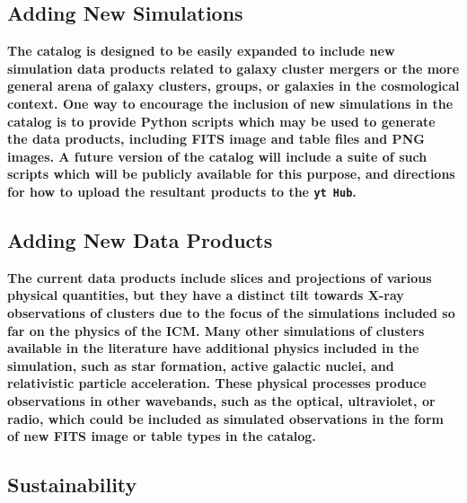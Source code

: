 \documentclass{emulateapj}
\newcommand{\code}[1]{\texttt{#1}}
\begin{document}
\subsection{Adding New Simulations}\label{sec:new_sims}

{\bf The catalog is designed to be easily expanded to include new simulation data products related to galaxy cluster mergers or the more general arena of galaxy clusters, groups, or galaxies in the cosmological context. One way to encourage the inclusion of new simulations in the catalog is to provide Python scripts which may be used to generate the data products, including FITS image and table files and PNG images. A future version of the catalog will include a suite of such scripts which will be publicly available for this purpose, and directions for how to upload the resultant products to the \code{yt Hub}.} 

\subsection{Adding New Data Products}\label{sec:new_data}

{\bf The current data products include slices and projections of various physical quantities, but they have a distinct tilt towards X-ray observations of clusters due to the focus of the simulations included so far on the physics of the ICM. Many other simulations of clusters available in the literature have additional physics included in the simulation, such as star formation, active galactic nuclei, and relativistic particle acceleration. These physical processes produce observations in other wavebands, such as the optical, ultraviolet, or radio, which could be included as simulated observations in the form of new FITS image or table types in the catalog.}

\subsection{Sustainability}\label{sec:sustainability}
\end{document}
